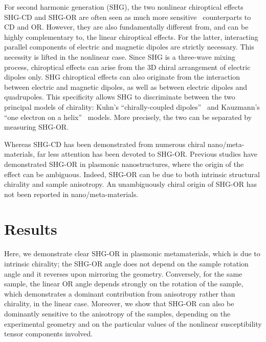 For second harmonic generation (SHG), the two nonlinear chiroptical effects SHG-CD and SHG-OR are often seen as much more sensitive~\cite{Petralli-Mallow1993} counterparts to CD and OR. However, they are also fundamentally different from, and can be highly complementary to, the linear chiroptical effects. For the latter, interacting parallel components of electric and magnetic dipoles are strictly necessary. This necessity is lifted in the nonlinear case. Since SHG is a three-wave mixing process, chiroptical effects can arise from the 3D chiral arrangement of electric dipoles only.\cite{verbiest2009second} 
SHG chiroptical effects can also originate from the interaction between electric and magnetic dipoles, as well as between electric dipoles and quadrupoles. This specificity allows SHG to discriminate between the two principal models of chirality:\cite{Fischer2005a} Kuhn's ``chirally-coupled dipoles''~\cite{Kuhn1930} and Kauzmann's ``one electron on a helix''~\cite{Kauzmann1957a} models. More precisely, the two can be separated by measuring SHG-OR. 

Whereas SHG-CD has been demonstrated from numerous chiral nano/meta-materials,\cite{Hooper2017, Mamonov2017, Chen2016, Kolkowski2015, Belardini2014} far less attention has been devoted to SHG-OR. Previous studies have demonstrated SHG-OR in plasmonic nanostructures, where the origin of the effect can be ambiguous.\cite{Romain2017, Ren2012a, Mamonov2012} Indeed, SHG-OR can be due to both intrinsic structural chirality and sample anisotropy. An unambiguously chiral origin of SHG-OR has not been reported in nano/meta-materials. 

\section{Results}\label{sec:results:OAinPlanarNanohelices:results}
Here, we demonstrate clear SHG-OR in plasmonic metamaterials, which is due to intrinsic chirality; the SHG-OR angle does not depend on the sample rotation angle and it reverses upon mirroring the geometry. Conversely, for the same sample, the linear OR angle depends strongly on the rotation of the sample, which demonstrates a dominant contribution from anisotropy rather than chirality, in the linear case. Moreover, we show that SHG-OR can also be dominantly sensitive to the anisotropy of the samples, depending on the experimental geometry and on the particular values of the nonlinear susceptibility tensor components involved. 

